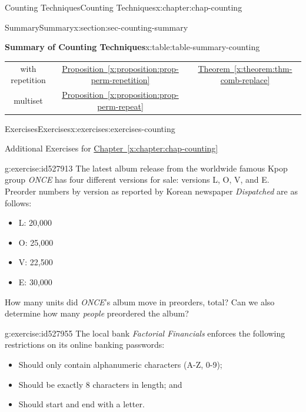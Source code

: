 \documentclass[oneside,10pt,]{book}
\newcommand{\xreffont}{\relax}
\numberwithin{equation}{section}
\begin{document}
\begin{chapterptx}{Counting Techniques}{}{Counting Techniques}{}{}{x:chapter:chap-counting}
\begin{sectionptx}{Summary}{}{Summary}{}{}{x:section:sec-counting-summary}
\begin{tableptx}{\textbf{Summary of Counting Techniques}}{x:table:table-summary-counting}{}
{\begin{tabular}{ccc}
with repetition&\hyperref[x:proposition:prop-perm-repetition]{Proposition~{\xreffont\ref{x:proposition:prop-perm-repetition}}}&\hyperref[x:theorem:thm-comb-replace]{Theorem~{\xreffont\ref{x:theorem:thm-comb-replace}}}\tabularnewline[0pt]
multiset&\hyperref[x:proposition:prop-perm-repeat]{Proposition~{\xreffont\ref{x:proposition:prop-perm-repeat}}}&\textendash{} \textendash{} \textendash{} \textendash{} \textendash{}
\end{tabular}
}%
\end{tableptx}%
\end{sectionptx}
%
%
\typeout{************************************************}
\typeout{************************************************}
%
\begin{exercises-section}{Exercises}{}{Exercises}{}{}{x:exercises:exercises-counting}
\begin{introduction}{}%
Additional Exercises for \hyperref[x:chapter:chap-counting]{Chapter~{\xreffont\ref{x:chapter:chap-counting}}}%
\end{introduction}%
\begin{divisionexercise}{1}{}{}{g:exercise:id527913}%
The latest album release from the worldwide famous Kpop group \emph{ONCE} has four different versions for sale: versions L, O, V, and E. Preorder numbers by version as reported by Korean newspaper \emph{Dispatched} are as follows:%
\begin{itemize}[label=\textbullet]
\item{}L: 20,000%
\item{}O: 25,000%
\item{}V: 22,500%
\item{}E: 30,000%
\end{itemize}
How many units did \emph{ONCE}'s album move in preorders, total? Can we also determine how many \emph{people} preordered the album?%
\end{divisionexercise}%
\begin{divisionexercise}{2}{}{}{g:exercise:id527955}%
The local bank \emph{Factorial Financials} enforces the following restrictions on its online banking passwords:%
\begin{itemize}[label=\textbullet]
\item{}Should only contain alphanumeric characters (A-Z, 0-9);%
\item{}Should be exactly 8 characters in length; and%
\item{}Should start and end with a letter.%
\end{itemize}

\end{divisionexercise}
\end{exercises-section}
\end{chapterptx}
\end{document}
